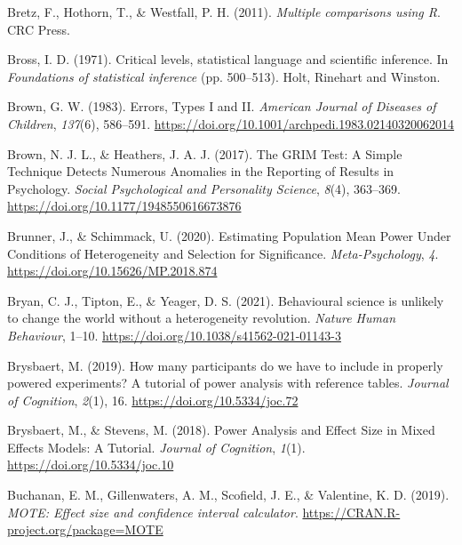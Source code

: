 \documentclass[
  oneside]{krantz}
\newlength{\cslhangindent}
\newlength{\cslentryspacingunit} %
\newenvironment{CSLReferences}[2] %
 {%
  \setlength{\parindent}{0pt}
  \ifodd #1
  \let\oldpar\par
  \def\par{\hangindent=\cslhangindent\oldpar}
  \fi
  \setlength{\parskip}{#2\cslentryspacingunit}
 }%
 {}
\begin{document}
\begin{CSLReferences}{1}{0}
\leavevmode{}%
Bretz, F., Hothorn, T., \& Westfall, P. H. (2011). \emph{Multiple
comparisons using {R}}. {CRC Press}.

\leavevmode{}%
Bross, I. D. (1971). Critical levels, statistical language and
scientific inference. In \emph{Foundations of statistical inference}
(pp. 500--513). {Holt, Rinehart and Winston}.

\leavevmode{}%
Brown, G. W. (1983). Errors, {Types I} and {II}. \emph{American Journal
of Diseases of Children}, \emph{137}(6), 586--591.
\url{https://doi.org/10.1001/archpedi.1983.02140320062014}

\leavevmode{}%
Brown, N. J. L., \& Heathers, J. A. J. (2017). The {GRIM Test}: {A
Simple Technique Detects Numerous Anomalies} in the {Reporting} of
{Results} in {Psychology}. \emph{Social Psychological and Personality
Science}, \emph{8}(4), 363--369.
\url{https://doi.org/10.1177/1948550616673876}

\leavevmode{}%
Brunner, J., \& Schimmack, U. (2020). Estimating {Population Mean Power
Under Conditions} of {Heterogeneity} and {Selection} for {Significance}.
\emph{Meta-Psychology}, \emph{4}.
\url{https://doi.org/10.15626/MP.2018.874}

\leavevmode{}%
Bryan, C. J., Tipton, E., \& Yeager, D. S. (2021). Behavioural science
is unlikely to change the world without a heterogeneity revolution.
\emph{Nature Human Behaviour}, 1--10.
\url{https://doi.org/10.1038/s41562-021-01143-3}

\leavevmode{}%
Brysbaert, M. (2019). How many participants do we have to include in
properly powered experiments? {A} tutorial of power analysis with
reference tables. \emph{Journal of Cognition}, \emph{2}(1), 16.
\url{https://doi.org/10.5334/joc.72}

\leavevmode{}%
Brysbaert, M., \& Stevens, M. (2018). Power {Analysis} and {Effect Size}
in {Mixed Effects Models}: {A Tutorial}. \emph{Journal of Cognition},
\emph{1}(1). \url{https://doi.org/10.5334/joc.10}

\leavevmode{}%
Buchanan, E. M., Gillenwaters, A. M., Scofield, J. E., \& Valentine, K.
D. (2019). \emph{MOTE: Effect size and confidence interval calculator}.
\url{https://CRAN.R-project.org/package=MOTE}


\end{CSLReferences}
\end{document}
